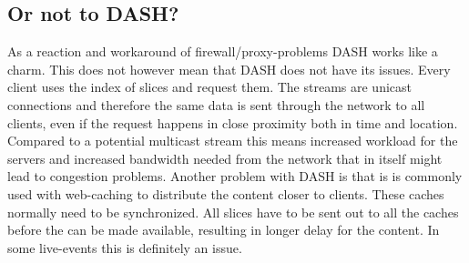 \documentclass{article}
\begin{document}
\subsection{Or not to DASH?}
As a reaction and workaround of firewall/proxy-problems DASH works like a charm. This does not however mean that DASH does not have its issues. Every client uses the index of slices and request them. The streams are unicast connections and therefore the same data is sent through the network to all clients, even if the request happens in close proximity both in time and location. Compared to a potential multicast stream this means increased workload for the servers and increased bandwidth needed from the network that in itself might lead to congestion problems. Another problem with DASH is that is is commonly used with web-caching to distribute the content closer to clients. These caches normally need to be synchronized. All slices have to be sent out to all the caches before the can be made available, resulting in longer delay for the content. In some live-events this is definitely an issue.   
   
\end{document}
